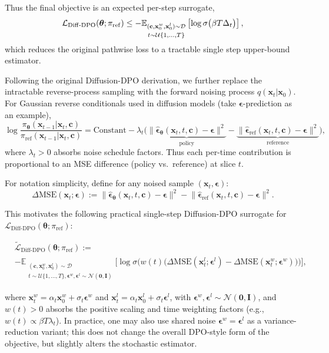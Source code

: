 Thus the final objective is an expected per-step surrogate,
\[
\mathcal L_{\mathrm{Diff\text{-}DPO}}(\bm\theta;\pi_{\mathrm{ref}})
 \le   
- \mathbb{E}_{\substack{(\mathbf c,\mathbf x_0^w,\mathbf x_0^l)\sim\mathcal D \\[2pt] t\sim \mathcal U\{1,\dots,T\}}}
\left[\log\sigma \big(\beta T  \Delta_t\big)\right],
\]
which reduces the original pathwise loss to a tractable single step upper-bound estimator.

Following the original Diffusion-DPO derivation, we further replace the intractable reverse-process sampling with the forward noising process $q(\mathbf x_t|\mathbf x_0)$. For Gaussian reverse conditionals used in diffusion models (take $\boldsymbol\epsilon$-prediction as an example),
\[
\log\frac{\pi_{\bm\theta}(\mathbf x_{t-1}| \mathbf x_t,\mathbf c)}{\pi_{\mathrm{ref}}(\mathbf x_{t-1}| \mathbf x_t,\mathbf c)}
= \text{Constant}
-\lambda_t \Big(\underbrace{\big\|\hat{\boldsymbol\epsilon}_{\bm\theta}(\mathbf x_t,t,\mathbf c)-\boldsymbol\epsilon\big\|^2}_{\mathrm{policy}}
-\underbrace{\big\|\hat{\boldsymbol\epsilon}_{\mathrm{ref}}(\mathbf x_t,t,\mathbf c)-\boldsymbol\epsilon\big\|^2}_{\mathrm{reference}}\Big),
\]
where $\lambda_t>0$ absorbs noise schedule factors. Thus each per-time contribution is proportional to an MSE difference (policy vs.\ reference) at slice $t$.

For notation simplicity, define for any noised sample $(\mathbf x_t,\boldsymbol\epsilon)$:
\[
\Delta\mathrm{MSE}(\mathbf x_t;\boldsymbol\epsilon)
:= \big\|\hat{\boldsymbol\epsilon}_{\bm\theta}(\mathbf x_t,t,\mathbf c)-\boldsymbol\epsilon\big\|^2
 - \big\|\hat{\boldsymbol\epsilon}_{\mathrm{ref}}(\mathbf x_t,t,\mathbf c)-\boldsymbol\epsilon\big\|^2.
\]

This motivates the following practical single-step Diffusion-DPO surrogate for $\mathcal L_{\mathrm{Diff\text{-}DPO}}(\bm\theta;\pi_{\mathrm{ref}})$:
\begin{mdframed}
\begin{align*}
    &\tilde{\mathcal L}_{\mathrm{Diff\text{-}DPO}}(\bm\theta;\pi_{\mathrm{ref}})
    :=
    \\&-\mathbb E_{\substack{(\mathbf c,\mathbf x_0^w,\mathbf x_0^l)\sim\mathcal D\\
    t\sim\mathcal U\{1,\dots,T\}, \boldsymbol\epsilon^w,\boldsymbol\epsilon^l\sim\mathcal N(\mathbf 0,\mathbf I)}}
    \Big[
    \log\sigma\!\Big(
    w(t)\big(\Delta\mathrm{MSE}(\mathbf x_t^l;\boldsymbol\epsilon^l)-\Delta\mathrm{MSE}(\mathbf x_t^w;\boldsymbol\epsilon^w)\big)
    \Big)
    \Big],
\end{align*}
\end{mdframed}
where $\mathbf x_t^w=\alpha_t \mathbf x_0^w+\sigma_t \boldsymbol\epsilon^w$ and $\mathbf x_t^l=\alpha_t \mathbf x_0^l+\sigma_t \boldsymbol\epsilon^l$, with $\boldsymbol\epsilon^w,\boldsymbol\epsilon^l\sim\mathcal N(\mathbf 0,\mathbf I)$, and $w(t)>0$ absorbs the positive scaling and time weighting factors (e.g., $w(t)\propto \beta T \lambda_t$). In practice, one may also use shared noise $\boldsymbol\epsilon^w=\boldsymbol\epsilon^l$
as a variance-reduction variant; this does not change the overall DPO-style form
of the objective, but slightly alters the stochastic estimator.

